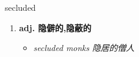 
\begin{frame}
{\huge secluded}
\begin{center}
\begin{enumerate}\Large
  \item \textbf{adj. 隐僻的,隐蔽的}
  \begin{itemize}
    \item \em{\Large{secluded monks 隐居的僧人}}
  \end{itemize}
\end{enumerate}
\end{center}
\end{frame}
